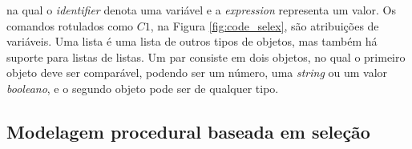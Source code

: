 \vspace{0.3cm}

\noindent na qual o \textit{identifier} denota uma variável e a \textit{expression} representa um valor. Os comandos rotulados como $C1$, na Figura \ref{fig:code_selex}, são atribuições de variáveis. Uma lista é uma lista de outros tipos de objetos, mas também há suporte para listas de listas. Um par consiste em dois objetos, no qual o primeiro objeto deve ser comparável, podendo ser um número, uma \textit{string} ou um valor \textit{booleano}, e o segundo objeto pode ser de qualquer tipo.

\begin{figure}[h!]
	\centering
	\captionsetup{width=15cm}
	{}	
\end{figure}

\subsection{Modelagem procedural baseada em seleção}
\label{sec:modelagem_selecao}

